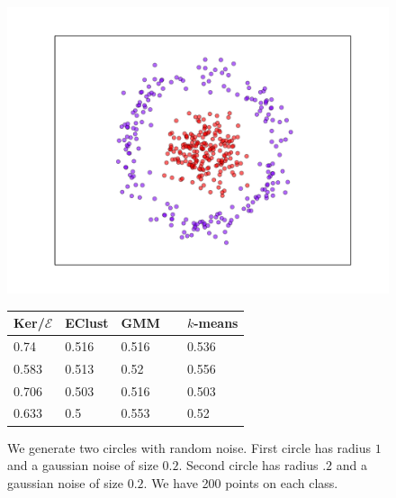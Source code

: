 \documentclass[aps,preprint,nofootinbib,floatfix]{revtex4-1}
\begin{document}
\begin{figure}[h]
\begin{minipage}{.49\textwidth}
\includegraphics[scale=.45]{circles.pdf}
\end{minipage}
\begin{minipage}{.49\textwidth}
\begin{tabular}{ l l l l}
\hline
Ker/$\mathcal{E}$ & EClust & GMM~~ & $k$-means \\
\hline
0.74 &
0.516 &
0.516 &
0.536 \\
0.583 &
0.513 &
0.52 & 
0.556 \\
0.706 &
0.503 &
0.516 &
0.503 \\
0.633 &
0.5 &
0.553 &
0.52 \\
\hline
\end{tabular}
\end{minipage}
\caption{\label{fig:circles}
We generate two circles with random noise.
First circle has radius $1$ and a gaussian noise of size $0.2$.
Second circle has radius $.2$ and a gaussian noise of size $0.2$.
We have 200 points on each class.
}
\end{figure}
\end{document}
